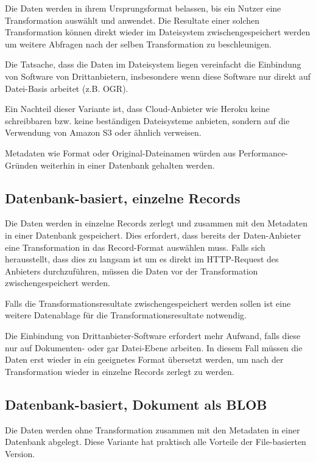 Die Daten werden in ihrem Ursprungsformat belassen, bis ein Nutzer eine Transformation auswählt und anwendet. Die Resultate einer solchen Transformation können direkt wieder im Dateisystem zwischengespeichert werden um weitere Abfragen nach der selben Transformation zu beschleunigen.

Die Tatsache, dass die Daten im Dateisystem liegen vereinfacht die Einbindung von Software von Drittanbietern, insbesondere wenn diese Software nur direkt auf Datei-Basis arbeitet (z.B. OGR).

Ein Nachteil dieser Variante ist, dass Cloud-Anbieter wie Heroku keine schreibbaren\cite{herokuReadOnlyFilesystem} bzw. keine beständigen\cite{herokuEphemeralFilesystem} Dateisysteme anbieten, sondern auf die Verwendung von Amazon S3 oder ähnlich verweisen.

Metadaten wie Format oder Original-Dateinamen würden aus Performance-Gründen weiterhin in einer Datenbank gehalten werden.

\subsection{Datenbank-basiert, einzelne Records}\label{sec:pd:datenbank-records}
Die Daten werden in einzelne Records zerlegt und zusammen mit den Metadaten in einer Datenbank gespeichert. Dies erfordert, dass bereits der Daten-Anbieter eine Transformation in das Record-Format auswählen muss. Falls sich herausstellt, dass dies zu langsam ist um es direkt im HTTP-Request des Anbieters durchzuführen, müssen die Daten vor der Transformation zwischengespeichert werden.

Falls die Transformationsresultate zwischengespeichert werden sollen ist eine weitere Datenablage für die Transformationsresultate notwendig.

Die Einbindung von Drittanbieter-Software erfordert mehr Aufwand, falls diese nur auf Dokumenten- oder gar Datei-Ebene arbeiten. In diesem Fall müssen die Daten erst wieder in ein geeignetes Format übersetzt werden, um nach der Transformation wieder in einzelne Records zerlegt zu werden.

\subsection{Datenbank-basiert, Dokument als BLOB}
Die Daten werden ohne Transformation zusammen mit den Metadaten in einer Datenbank abgelegt. Diese Variante hat praktisch alle Vorteile der File-basierten Version.

